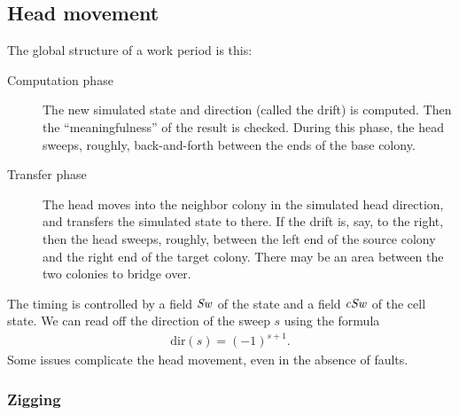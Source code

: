 \documentclass[12pt]{memoir}
\newcommand{\fld}[1]{\ensuremath{\textit{#1\/}}}
\newcommand{\Sweep}{\fld{Sw}}
\newcommand{\cSweep}{\fld{cSw}}
\newcommand{\dir}{\mathrm{dir}}
\begin{document}
\subsection{Head movement}\label{sec:sweep}

The global structure of a work period is this:
\begin{description}

\item[Computation phase] 
The new simulated state and direction (called the drift) is computed.
Then the ``meaningfulness'' of the result is checked.
During this phase, the head sweeps, roughly, back-and-forth between
the ends of the base colony.

\item[Transfer phase]
The head moves into the neighbor colony in the simulated head direction,
and transfers the simulated state to there.
If the drift is, say, to the right, then the head sweeps, roughly, between the 
left end of the source colony and the right end of the target colony.
There may be an area between the  two colonies to bridge over.
\end{description}

The timing is controlled by a field \( \Sweep \) of the state and a field \( \cSweep \)  of the
cell state.
We can read off the direction of the sweep \( s \) using the formula
     \begin{align}\label{eq:sweep-dir}
       \dir(s)=(-1)^{s + 1}.
     \end{align}
Some issues complicate the head movement, even in the absence of faults.

\subsubsection{Zigging}\label{sec:zigging}
\end{document}
